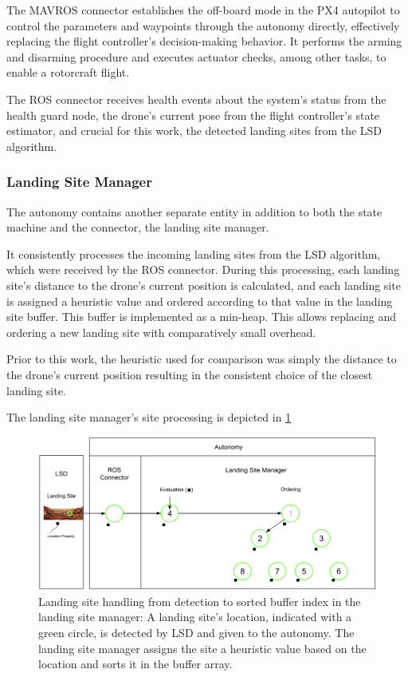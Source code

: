 The MAVROS connector establishes the off-board mode in the PX4 autopilot to control the parameters and waypoints through the autonomy directly, effectively replacing the flight controller's decision-making behavior. It performs the arming and disarming procedure and executes actuator checks, among other tasks, to enable a rotorcraft flight.

The ROS connector receives health events about the system's status from the health guard node, the drone's current pose from the flight controller's state estimator, and crucial for this work, the detected landing sites from the LSD algorithm.

\subsubsection{Landing Site Manager}\label{subsubsec:LSM}

The autonomy contains another separate entity in addition to both the state machine and the connector, the landing site manager. 

It consistently processes the incoming landing sites from the LSD algorithm, which were received by the ROS connector. During this processing, each landing site's distance to the drone's current position is calculated, and each landing site is assigned a heuristic value and ordered according to that value in the landing site buffer. This buffer is implemented as a min-heap. This allows replacing and ordering a new landing site with comparatively small overhead. 

Prior to this work, the heuristic used for comparison was simply the distance to the drone's current position resulting in the consistent choice of the closest landing site. 

The landing site manager's site processing is depicted in \cref{fig:lsm_ls_processing}

\begin{figure}[h]
\centering
\includegraphics[scale=0.165]{images/system_overview/lsm_handling.png}
\caption{Landing site handling from detection to sorted buffer index in the landing site manager: A landing site's location, indicated with a green circle, is detected by LSD and given to the autonomy. The landing site manager assigns the site a heuristic value based on the location and sorts it in the buffer array.}
\label{fig:lsm_ls_processing}
\end{figure}

